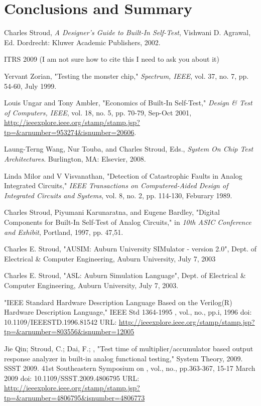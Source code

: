 \documentclass[12pt]{report}
\begin{document}
\chapter{Conclusions and Summary}

\begin{thebibliography}{99}
 Charles Stroud, {\em A Designer's Guide to Built-In Self-Test}, Vishwani D. Agrawal, Ed. Dordrecht: Kluwer Academic Publishers, 2002.

 ITRS 2009 (I am not sure how to cite this I need to ask you about it)

 Yervant Zorian, "Testing the monster chip," {\em Spectrum, IEEE}, vol. 37, no. 7, pp. 54-60, July 1999.

 Louis Ungar and Tony Ambler, "Economics of Built-In Self-Test," {\em Design \& Test of Computers, IEEE}, vol. 18, no. 5, pp. 70-79, Sep-Oct 2001, \url{http://ieeexplore.ieee.org/stamp/stamp.jsp?tp=&arnumber=953274&isnumber=20606}.

 Laung-Terng Wang, Nur Touba, and Charles Stroud, Eds., {\em System On Chip Test Architectures}. Burlington, MA: Elsevier, 2008.

 Linda Milor and V Visvanathan, "Detection of Catastrophic Faults in Analog Integrated Circuits," {\em IEEE Transactions on Computered-Aided Design of Integrated Circuits and Systems}, vol. 8, no. 2, pp. 114-130, Feburary 1989.

 Charles Stroud, Piyumani Karunaratna, and Eugene Bardley, "Digital Components for Built-In Self-Test of Analog Circuits," in {\em 10th ASIC Conference and Exhibit}, Portland, 1997, pp. 47,51.

  Charles E. Stroud, "AUSIM: Auburn University SIMulator - version 2.0", Dept. of Electrical \& 
Computer Engineering, Auburn University, July 7, 2003

 Charles E. Stroud, "ASL: Auburn Simulation Language", Dept. of Electrical \& Computer
Engineering, Auburn University, July 7, 2003.

 "IEEE Standard Hardware Description Language Based on the Verilog(R) Hardware Description Language," IEEE Std 1364-1995 , vol., no., pp.i, 1996 doi: 10.1109/IEEESTD.1996.81542 URL: \url{http://ieeexplore.ieee.org/stamp/stamp.jsp?tp=&arnumber=803556&isnumber=12005}

 Jie Qin; Stroud, C.; Dai, F.; , "Test time of multiplier/accumulator based output response analyzer in built-in analog functional testing," System Theory, 2009. SSST 2009. 41st Southeastern Symposium on , vol., no., pp.363-367, 15-17 March 2009 doi: 10.1109/SSST.2009.4806795 URL: \url{http://ieeexplore.ieee.org/stamp/stamp.jsp?tp=&arnumber=4806795&isnumber=4806773}


\end{thebibliography}
\end{document}
